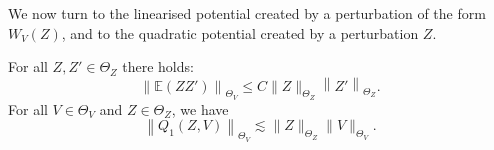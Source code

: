 \documentclass[AHL, Unicode, longabstracts,published]{cedram}
\newcommand{\E}{\mathbb{E}}
\begin{document}
We now turn to the linearised potential created by a perturbation of the form $W_V(Z)$, and to the quadratic potential created by a perturbation $Z$.


\begin{lemm}\label{lemm6.2}
For all $Z,Z'\in \Theta_Z$ there holds:
\begin{equation} \label{bd:quadembed}
\left\|\E(ZZ')\right\|_{\Theta_V}\leq C \| Z\|_{\Theta_Z}\left\| Z'\right\|_{\Theta_Z}.
\end{equation} For all $V \in \Theta_V$ and $Z \in \Theta_Z$, we have
\begin{equation} \label{bd:Q1}
\left\|Q_1(Z,V)\right\|_{\Theta_V} \lesssim \|Z\|_{\Theta_Z} \|V\|_{\Theta_V}.
\end{equation}
\end{lemm}
\end{document}
